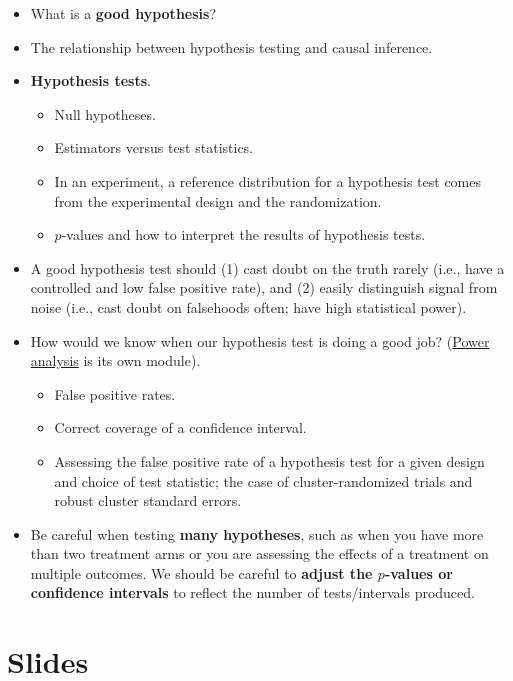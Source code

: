 \documentclass[12pt,]{book}
\begin{document}
\begin{itemize}
\item
  What is a \textbf{good hypothesis}?
\item
  The relationship between hypothesis testing and causal inference.
\item
  \textbf{Hypothesis tests}.

  \begin{itemize}
  \item
    Null hypotheses.
  \item
    Estimators versus test statistics.
  \item
    In an experiment, a reference distribution for a hypothesis test comes from the experimental design and the randomization.
  \item
    \(p\)-values and how to interpret the results of hypothesis tests.
  \end{itemize}
\item
  A good hypothesis test should (1) cast doubt on the truth rarely (i.e., have a controlled and low false positive rate), and (2) easily distinguish signal from noise (i.e., cast doubt on falsehoods often; have high statistical power).
\item
  How would we know when our hypothesis test is doing a good job? (\href{statistical-power-and-design-diagnosands.html}{Power analysis} is its own module).

  \begin{itemize}
  \item
    False positive rates.
  \item
    Correct coverage of a confidence interval.
  \item
    Assessing the false positive rate of a hypothesis test for a given design and choice of test statistic; the case of cluster-randomized trials and robust cluster standard errors.
  \end{itemize}
\item
  Be careful when testing \textbf{many hypotheses}, such as when you have more than two treatment arms or you are assessing the effects of a treatment on multiple outcomes. We should be careful to \textbf{adjust the \(p\)-values or confidence intervals} to reflect the number of tests/intervals produced.
\end{itemize}

\hypertarget{slides-3}{%
\section{Slides}\label{slides-3}}
\end{document}
